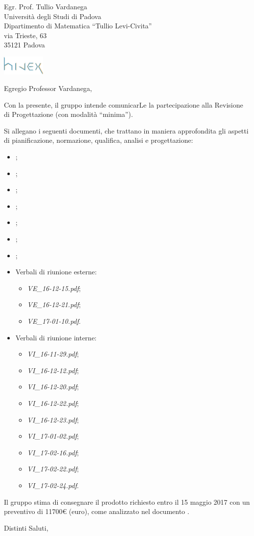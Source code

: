 \documentclass[a4paper]{letter} %
\date{Padova, \today}
\begin{document}
\begin{letter}{Egr. Prof. Tullio Vardanega\\
Università degli Studi di Padova\\
Dipartimento di Matematica “Tullio Levi-Civita”\\
via Trieste, 63\\
35121 Padova}

\includegraphics[width=80px]{../../util/hivex_logo3.png}

\opening{Egregio Professor Vardanega,}

Con la presente, il gruppo \hx{} intende comunicarLe la partecipazione alla Revisione di Progettazione (con modalità “minima”).

Si allegano i seguenti documenti, che trattano in maniera approfondita gli aspetti di pianificazione, normazione, qualifica, analisi e progettazione:
\begin{itemize}
	\item \SdF;
	\item \NdP;
	\item \PdP;
	\item \PdQ;
	\item \AdR;
	\item \ST;
	\item \Glossario;
	\item Verbali di riunione esterne:
	\begin{itemize}
		\item \emph{VE\_16-12-15.pdf};
		\item \emph{VE\_16-12-21.pdf};
		\item \emph{VE\_17-01-10.pdf}.
	\end{itemize}
	\item Verbali di riunione interne:
	\begin{itemize}
		\item \emph{VI\_16-11-29.pdf};
		\item \emph{VI\_16-12-12.pdf};
		\item \emph{VI\_16-12-20.pdf};
		\item \emph{VI\_16-12-22.pdf};
		\item \emph{VI\_16-12-23.pdf};
		\item \emph{VI\_17-01-02.pdf};
		\item \emph{VI\_17-02-16.pdf};
		\item \emph{VI\_17-02-22.pdf};
		\item \emph{VI\_17-02-24.pdf}.
	\end{itemize}
\end{itemize}

Il gruppo \hx{} stima di consegnare il prodotto richiesto entro il 15 maggio 2017 con un preventivo di \num{11700}\euro{} (euro), come analizzato nel documento \PdP.

\closing{Distinti Saluti,}

\end{letter}
\end{document}
